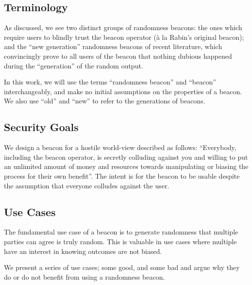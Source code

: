 \subsection{Terminology}
As discussed, we see two distinct groups of randomness beacons: the ones which require users to blindly trust the beacon operator (à la Rabin's original beacon); and the \enquote{new generation} randomness beacons of recent literature, which convincingly prove to all users of the beacon that nothing dubious happened during the \enquote{generation} of the random output.

In this work, we will use the terms \enquote{randomness beacon} and \enquote{beacon} interchangeably, and make no initial assumptions on the properties of a beacon. We also use \enquote{old} and \enquote{new} to refer to the generations of beacons.

\subsection{Security Goals}
We design a beacon for a hostile world-view described as follows:
\enquote{Everybody, including the beacon operator, is secretly colluding against you and willing to put an unlimited amount of money and resources towards manipulating or biasing the process for their own benefit}.
The intent is for the beacon to be usable despite the assumption that everyone colludes against the user.

\subsection{Use Cases}

The fundamental use case of a beacon is to generate randomness that multiple parties can agree is truly random. This is valuable in use cases where multiple have an interest in knowing outcomes are not biased.

We present a series of use cases; some good, and some bad and argue why they do or do not benefit from using a randomness beacon.

